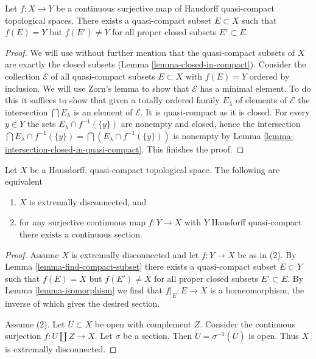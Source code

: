 \begin{lemma}
\label{lemma-find-compact-subset}
Let $f : X \to Y$ be a continuous surjective map of Hausforff quasi-compact
topological spaces. There exists a quasi-compact subset $E \subset X$
such that $f(E) = Y$ but $f(E') \not = Y$ for all proper closed subsets
$E' \subset E$.
\end{lemma}

\begin{proof}
We will use without further mention that the quasi-compact subsets
of $X$ are exactly the closed subsets
(Lemma \ref{lemma-closed-in-compact}).
Consider the collection $\mathcal{E}$ of all quasi-compact subsets
$E \subset X$ with $f(E) = Y$ ordered by inclusion. We will use
Zorn's lemma to show that
$\mathcal{E}$ has a minimal element. To do this it suffices to show
that given a totally ordered family $E_\lambda$ of elements of $\mathcal{E}$
the intersection $\bigcap E_\lambda$ is an element of $\mathcal{E}$.
It is quasi-compact as it is closed.
For every $y \in Y$ the sets $E_\lambda \cap f^{-1}(\{y\})$
are nonempty and closed, hence the intersection
$\bigcap E_\lambda \cap f^{-1}(\{y\}) = \bigcap (E_\lambda \cap f^{-1}(\{y\}))$
is nonempty by
Lemma \ref{lemma-intersection-closed-in-quasi-compact}.
This finishes the proof.
\end{proof}

\begin{proposition}
\label{proposition-projective-in-category-hausdorff-qc}
Let $X$ be a Hausdorff, quasi-compact topological space.
The following are equivalent
\begin{enumerate}
\item $X$ is extremally disconnected, and
\item for any surjective continuous map $f : Y \to X$ with $Y$ Hausforff
quasi-compact there exists a continuous section.
\end{enumerate}
\end{proposition}

\begin{proof}
Assume $X$ is extremally disconnected and let $f : Y \to X$ be as in (2).
By Lemma \ref{lemma-find-compact-subset} there exists a quasi-compact subset
$E \subset Y$ such that $f(E) = X$ but $f(E') \not = X$ for all
proper closed subsets $E' \subset E$. By
Lemma \ref{lemma-isomorphism} we find that $f|_E : E \to X$
is a homeomorphism, the inverse of which gives the desired section.

\medskip\noindent
Assume (2). Let $U \subset X$ be open with complement $Z$.
Consider the continuous surjection $f : \overline{U} \amalg Z \to X$.
Let $\sigma$ be a section. Then $\overline{U} = \sigma^{-1}(\overline{U})$
is open. Thus $X$ is extremally disconnected.
\end{proof}

